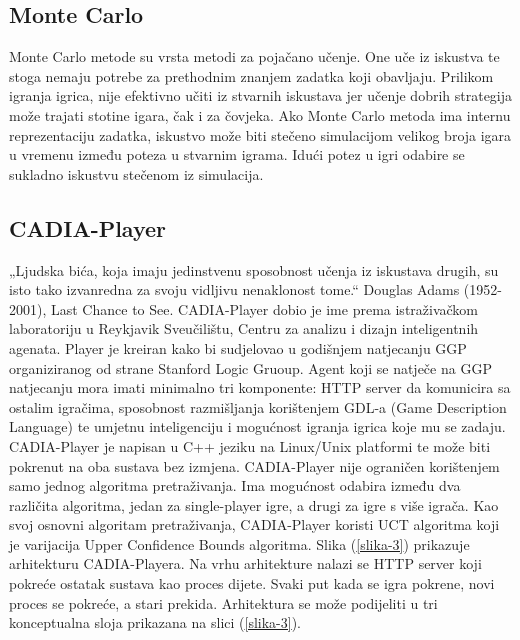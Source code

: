 \documentclass[a4paper,12pt]{foi}
\begin{document}
\subsection{Monte Carlo}
Monte Carlo metode su  vrsta metodi za pojačano učenje. One uče iz iskustva te stoga nemaju potrebe za prethodnim znanjem zadatka koji obavljaju. Prilikom igranja igrica, nije efektivno učiti iz stvarnih iskustava jer učenje dobrih strategija može trajati stotine igara, čak i za čovjeka. Ako Monte Carlo metoda ima internu reprezentaciju zadatka, iskustvo može biti stečeno simulacijom velikog broja igara u vremenu između poteza u stvarnim igrama. Idući potez u igri odabire se sukladno iskustvu stečenom iz simulacija.
\subsection{CADIA-Player}
„Ljudska bića, koja imaju jedinstvenu sposobnost učenja iz iskustava drugih, su isto tako izvanredna za svoju vidljivu nenaklonost tome.“ Douglas Adams (1952-2001), Last Chance to See.
CADIA-Player dobio je ime prema istraživačkom laboratoriju u Reykjavik Sveučilištu, Centru za analizu i dizajn inteligentnih agenata. Player je kreiran kako bi sudjelovao u godišnjem natjecanju GGP organiziranog od strane Stanford Logic Gruoup. Agent koji se natječe na GGP natjecanju mora imati minimalno tri komponente: HTTP server da komunicira sa ostalim igračima, sposobnost razmišljanja korištenjem GDL-a (Game Description Language) te umjetnu inteligenciju i mogućnost igranja igrica koje mu se zadaju. CADIA-Player je napisan u C++ jeziku na Linux/Unix platformi te može biti pokrenut na oba sustava bez izmjena.
CADIA-Player nije ograničen korištenjem samo jednog algoritma pretraživanja. Ima mogućnost odabira  između dva različita algoritma, jedan za single-player igre, a drugi za igre s više igrača. Kao svoj osnovni algoritam pretraživanja, CADIA-Player koristi UCT algoritma koji je varijacija Upper Confidence Bounds algoritma.
Slika (\ref{slika-3}) prikazuje arhitekturu CADIA-Playera. Na vrhu arhitekture nalazi se HTTP server koji pokreće ostatak sustava kao proces dijete. Svaki put kada se igra pokrene, novi proces se pokreće, a stari prekida. Arhitektura se može podijeliti u tri konceptualna sloja prikazana na slici (\ref{slika-3}).
\end{document}
